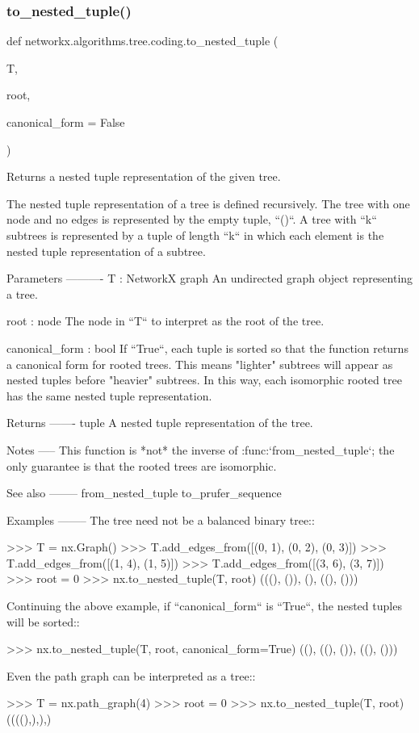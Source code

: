 \subsubsection{\texorpdfstring{to\+\_\+nested\+\_\+tuple()}{to\_nested\_tuple()}}
{\footnotesize\ttfamily def networkx.\+algorithms.\+tree.\+coding.\+to\+\_\+nested\+\_\+tuple (\begin{DoxyParamCaption}\item[{}]{T,  }\item[{}]{root,  }\item[{}]{canonical\+\_\+form = {\ttfamily False} }\end{DoxyParamCaption})}

\begin{DoxyVerb}Returns a nested tuple representation of the given tree.

The nested tuple representation of a tree is defined
recursively. The tree with one node and no edges is represented by
the empty tuple, ``()``. A tree with ``k`` subtrees is represented
by a tuple of length ``k`` in which each element is the nested tuple
representation of a subtree.

Parameters
----------
T : NetworkX graph
    An undirected graph object representing a tree.

root : node
    The node in ``T`` to interpret as the root of the tree.

canonical_form : bool
    If ``True``, each tuple is sorted so that the function returns
    a canonical form for rooted trees. This means "lighter" subtrees
    will appear as nested tuples before "heavier" subtrees. In this
    way, each isomorphic rooted tree has the same nested tuple
    representation.

Returns
-------
tuple
    A nested tuple representation of the tree.

Notes
-----
This function is *not* the inverse of :func:`from_nested_tuple`; the
only guarantee is that the rooted trees are isomorphic.

See also
--------
from_nested_tuple
to_prufer_sequence

Examples
--------
The tree need not be a balanced binary tree::

    >>> T = nx.Graph()
    >>> T.add_edges_from([(0, 1), (0, 2), (0, 3)])
    >>> T.add_edges_from([(1, 4), (1, 5)])
    >>> T.add_edges_from([(3, 6), (3, 7)])
    >>> root = 0
    >>> nx.to_nested_tuple(T, root)
    (((), ()), (), ((), ()))

Continuing the above example, if ``canonical_form`` is ``True``, the
nested tuples will be sorted::

    >>> nx.to_nested_tuple(T, root, canonical_form=True)
    ((), ((), ()), ((), ()))

Even the path graph can be interpreted as a tree::

    >>> T = nx.path_graph(4)
    >>> root = 0
    >>> nx.to_nested_tuple(T, root)
    ((((),),),)\end{DoxyVerb}
